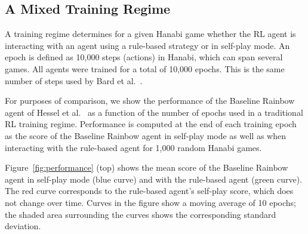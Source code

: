 \documentclass[letterpaper]{article} %
\begin{document}
\subsection{A Mixed Training Regime}
\label{training regimes}
A training regime determines  for a given Hanabi game whether the RL agent  is interacting with  an agent using  a rule-based strategy or in self-play mode. An epoch is defined as 10,000 steps (actions) in Hanabi, which can span several games. All agents were trained for a total of  10,000 epochs.  This is the same number of steps used by Bard et al.~.




For purposes of comparison,  we  show the performance of the Baseline Rainbow agent of Hessel et al.~ as a function of the number of epochs used in a traditional RL training regime. Performance is computed at the end of each training epoch as the score of the Baseline Rainbow agent in self-play mode as well as  when interacting with the rule-based agent for 1,000 random Hanabi games.

Figure~\ref{fig:performance} (top) shows the mean score of the Baseline Rainbow agent in self-play mode  (blue curve) and  with the rule-based agent (green curve). The red curve corresponds to the rule-based agent's self-play score, which does not change over time. Curves in the figure show a moving average of 10 epochs;  the  shaded area  surrounding the curves shows the corresponding standard deviation.
\end{document}
